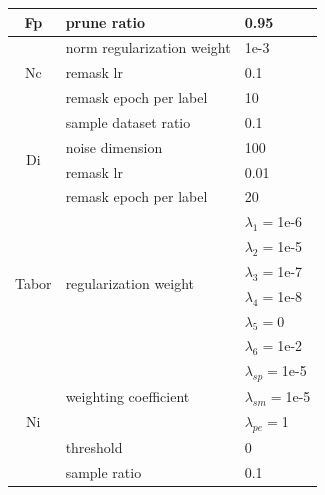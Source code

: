 \documentclass[compsoc,conference,a4paper,10pt,times]{IEEEtran}
\newcommand{\nc}{{\sc Nc}\xspace}
\newcommand{\ninspect}{{\sc Ni}\xspace}
\newcommand{\tabor}{{\sc Tabor}\xspace}
\newcommand{\di}{{\sc Di}\xspace}
\newcommand{\fp}{{\sc Fp}\xspace}
\begin{document}
\begin{table}[!ht]
{\begin{tabular}{c|l|l}
            \multirow{1}{*}{\fp}       & prune ratio                            & 0.95                \\
            \hline

            \multirow{3}{*}{\nc}       & norm regularization weight             & 1e-3                \\
                                      & remask lr                              & 0.1                 \\
                                      & remask epoch per label                 & 10                  \\
            \hline


            \multirow{4}{*}{\di}       & sample dataset ratio                   & 0.1                 \\
                                      & noise dimension                        & 100                 \\
                                      & remask lr                              & 0.01                \\
                                      & remask epoch per label                 & 20                  \\
            \hline

            \multirow{6}{*}{\tabor}    & \multirow{6}{*}{regularization weight} & $\lambda_{1}=$1e-6  \\
                                      &                                        & $\lambda_{2}=$1e-5  \\
                                      &                                        & $\lambda_{3}=$1e-7  \\
                                      &                                        & $\lambda_{4}=$1e-8  \\
                                      &                                        & $\lambda_{5}=$0     \\
                                      &                                        & $\lambda_{6}=$1e-2  \\
            \hline

            \multirow{5}{*}{\ninspect} & \multirow{3}{*}{weighting coefficient} & $\lambda_{sp}=$1e-5 \\
                                      &                                        & $\lambda_{sm}=$1e-5 \\
                                      &                                        & $\lambda_{pe}=$1    \\\cline{2-3}
                                      & threshold                              & 0                   \\
                                      & sample ratio                           & 0.1                 \\
            \hline



\end{tabular}}
\end{table}
\end{document}
